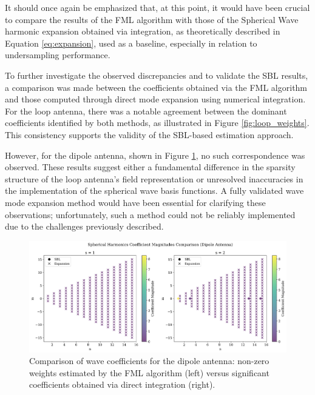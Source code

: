 \documentclass{article}
\begin{document}
It should once again be emphasized that, at this point, it would have been crucial to compare the results of the FML algorithm with those of the Spherical Wave harmonic expansion obtained via integration, as theoretically described in Equation \ref{eq:expansion}, used as a baseline, especially in relation to undersampling performance.

To further investigate the observed discrepancies and to validate the SBL results, a comparison was made between the coefficients obtained via the FML algorithm and those computed through direct mode expansion using numerical integration. For the loop antenna, there was a notable agreement between the dominant coefficients identified by both methods, as illustrated in Figure \ref{fig:loop_weights}. This consistency supports the validity of the SBL-based estimation approach.

However, for the dipole antenna, shown in Figure \ref{fig:dipole_weights}, no such correspondence was observed. These results suggest either a fundamental difference in the sparsity structure of the loop antenna’s field representation or unresolved inaccuracies in the implementation of the spherical wave basis functions. A fully validated wave mode expansion method would have been essential for clarifying these observations; unfortunately, such a method could not be reliably implemented due to the challenges previously described.

\begin{figure}[H]
    \centering
    \includegraphics[width=1\linewidth]{Figures/dipole_ff_weights.png}
    \caption{Comparison of wave coefficients for the dipole antenna: non-zero weights estimated by the FML algorithm (left) versus significant coefficients obtained via direct integration (right).}
    \label{fig:dipole_weights}
\end{figure}
\end{document}
